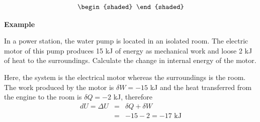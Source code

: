 \begin{subequations}
\begin{shaded}
         \end{shaded}
   
     \end{subequations}
   
   \begin{MyExample}{\begin{center}{\bf Example}\end{center}}
     \begin{example}\label{Chapter:FirstLaw:Example1}\citep{Atkins_Book}
        In a power station, the water pump is located in an isolated room. The electric motor of this pump produces 15 kJ of energy as mechanical work and loose 2 kJ of heat to the surroundings. Calculate the change in internal energy of the motor.  
     \end{example}

       Here, the system is the electrical motor whereas the surroundings is the room. The work produced by the motor is $\delta W= -15$ kJ and the heat transferred from the engine to the room is $\delta Q = -2$ kJ, therefore 
          \begin{eqnarray}
             dU = \Delta U &=&  \delta Q + \delta W \nonumber \\
                &=& -15 -2 = -17\text{ kJ} \nonumber
          \end{eqnarray}
   \end{MyExample}

